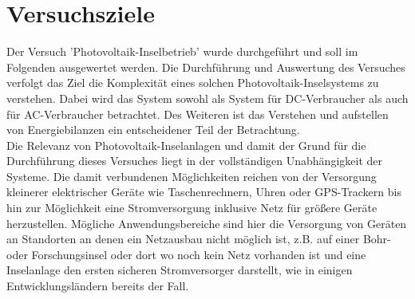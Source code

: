 \section{Versuchsziele}
Der Versuch 'Photovoltaik-Inselbetrieb' wurde durchgeführt und
 soll im Folgenden ausgewertet werden. Die Durchführung und Auswertung des 
 Versuches verfolgt das Ziel die Komplexität eines solchen 
 Photovoltaik-Inselsystems zu verstehen. Dabei wird das System sowohl als System 
 für DC-Verbraucher als auch für AC-Verbraucher betrachtet. Des Weiteren ist das
 Verstehen und aufstellen von Energiebilanzen ein entscheidener Teil der Betrachtung.\\
 Die Relevanz von Photovoltaik-Inselanlagen und damit der Grund für die Durchführung
 dieses Versuches liegt in der vollständigen Unabhängigkeit der Systeme. Die damit
 verbundenen Möglichkeiten reichen von der Versorgung kleinerer elektrischer Geräte
 wie Taschenrechnern, Uhren oder GPS-Trackern bis hin zur Möglichkeit eine Stromversorgung
 inklusive Netz für größere Geräte herzustellen.
 Mögliche Anwendungsbereiche sind hier die Versorgung von Geräten an Standorten
 an denen ein Netzausbau nicht möglich ist, z.B. auf einer Bohr- oder Forschungsinsel
 oder dort wo noch kein Netz vorhanden ist und eine Inselanlage den ersten sicheren
 Stromversorger darstellt, wie in einigen Entwicklungsländern bereits der Fall.\\
